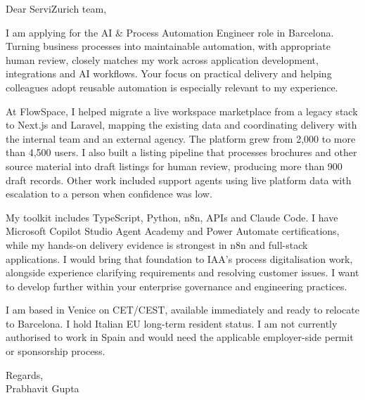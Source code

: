\documentclass[a4paper,11pt]{article}
\begin{document}
Dear ServiZurich team,

I am applying for the AI \& Process Automation Engineer role in Barcelona. Turning business processes into maintainable automation, with appropriate human review, closely matches my work across application development, integrations and AI workflows. Your focus on practical delivery and helping colleagues adopt reusable automation is especially relevant to my experience.

At FlowSpace, I helped migrate a live workspace marketplace from a legacy stack to Next.js and Laravel, mapping the existing data and coordinating delivery with the internal team and an external agency. The platform grew from 2,000 to more than 4,500 users. I also built a listing pipeline that processes brochures and other source material into draft listings for human review, producing more than 900 draft records. Other work included support agents using live platform data with escalation to a person when confidence was low.

My toolkit includes TypeScript, Python, n8n, APIs and Claude Code. I have Microsoft Copilot Studio Agent Academy and Power Automate certifications, while my hands-on delivery evidence is strongest in n8n and full-stack applications. I would bring that foundation to IAA's process digitalisation work, alongside experience clarifying requirements and resolving customer issues. I want to develop further within your enterprise governance and engineering practices.

I am based in Venice on CET/CEST, available immediately and ready to relocate to Barcelona. I hold Italian EU long-term resident status. I am not currently authorised to work in Spain and would need the applicable employer-side permit or sponsorship process.

Regards,\\
Prabhavit Gupta
\end{document}
